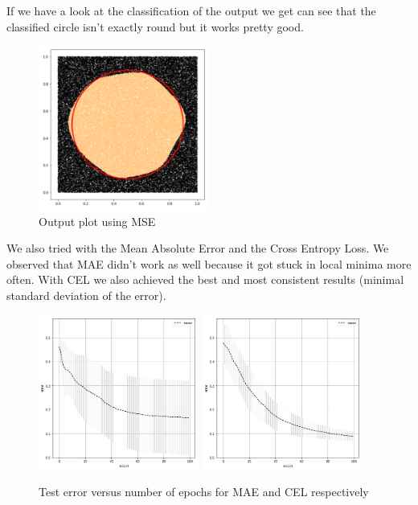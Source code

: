 \documentclass{article}
\begin{document}
If we have a look at the classification of the output we get can see that the classified circle isn't exactly round but it works pretty good. 

\begin{figure}[H]
\begin{center}
\includegraphics[width=0.5\textwidth]{mse_plot}
\caption{Output plot using MSE}
\end{center}
\end{figure}


We also tried with the Mean Absolute Error and the Cross Entropy Loss. We observed that MAE didn't work as well because it got stuck in local minima more often. With CEL we also achieved the best and most consistent results (minimal standard deviation of the error).
  
\begin{figure}[H]
\begin{center}
\includegraphics[width=0.47\textwidth]{err_mae}
\includegraphics[width=0.47\textwidth]{cel_err}
\caption{Test error versus number of epochs for MAE and CEL respectively}
\end{center}
\end{figure}
\end{document}
